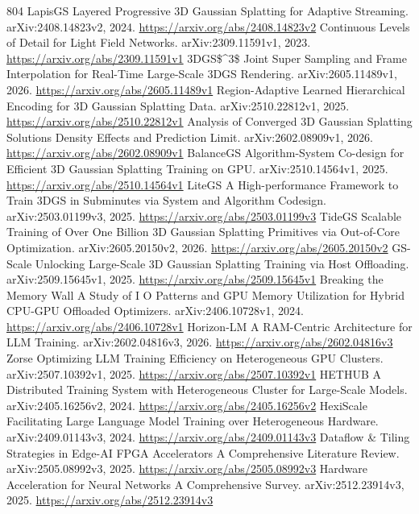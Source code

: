 \documentclass[11pt]{article}
\begin{document}
\begin{thebibliography}{804}
 LapisGS Layered Progressive 3D Gaussian Splatting for Adaptive Streaming. arXiv:2408.14823v2, 2024. \url{https://arxiv.org/abs/2408.14823v2}
 Continuous Levels of Detail for Light Field Networks. arXiv:2309.11591v1, 2023. \url{https://arxiv.org/abs/2309.11591v1}
 3DGS\$\textasciicircum{}3\$ Joint Super Sampling and Frame Interpolation for Real-Time Large-Scale 3DGS Rendering. arXiv:2605.11489v1, 2026. \url{https://arxiv.org/abs/2605.11489v1}
 Region-Adaptive Learned Hierarchical Encoding for 3D Gaussian Splatting Data. arXiv:2510.22812v1, 2025. \url{https://arxiv.org/abs/2510.22812v1}
 Analysis of Converged 3D Gaussian Splatting Solutions Density Effects and Prediction Limit. arXiv:2602.08909v1, 2026. \url{https://arxiv.org/abs/2602.08909v1}
 BalanceGS Algorithm-System Co-design for Efficient 3D Gaussian Splatting Training on GPU. arXiv:2510.14564v1, 2025. \url{https://arxiv.org/abs/2510.14564v1}
 LiteGS A High-performance Framework to Train 3DGS in Subminutes via System and Algorithm Codesign. arXiv:2503.01199v3, 2025. \url{https://arxiv.org/abs/2503.01199v3}
 TideGS Scalable Training of Over One Billion 3D Gaussian Splatting Primitives via Out-of-Core Optimization. arXiv:2605.20150v2, 2026. \url{https://arxiv.org/abs/2605.20150v2}
 GS-Scale Unlocking Large-Scale 3D Gaussian Splatting Training via Host Offloading. arXiv:2509.15645v1, 2025. \url{https://arxiv.org/abs/2509.15645v1}
 Breaking the Memory Wall A Study of I O Patterns and GPU Memory Utilization for Hybrid CPU-GPU Offloaded Optimizers. arXiv:2406.10728v1, 2024. \url{https://arxiv.org/abs/2406.10728v1}
 Horizon-LM A RAM-Centric Architecture for LLM Training. arXiv:2602.04816v3, 2026. \url{https://arxiv.org/abs/2602.04816v3}
 Zorse Optimizing LLM Training Efficiency on Heterogeneous GPU Clusters. arXiv:2507.10392v1, 2025. \url{https://arxiv.org/abs/2507.10392v1}
 HETHUB A Distributed Training System with Heterogeneous Cluster for Large-Scale Models. arXiv:2405.16256v2, 2024. \url{https://arxiv.org/abs/2405.16256v2}
 HexiScale Facilitating Large Language Model Training over Heterogeneous Hardware. arXiv:2409.01143v3, 2024. \url{https://arxiv.org/abs/2409.01143v3}
 Dataflow \& Tiling Strategies in Edge-AI FPGA Accelerators A Comprehensive Literature Review. arXiv:2505.08992v3, 2025. \url{https://arxiv.org/abs/2505.08992v3}
 Hardware Acceleration for Neural Networks A Comprehensive Survey. arXiv:2512.23914v3, 2025. \url{https://arxiv.org/abs/2512.23914v3}

\end{thebibliography}
\end{document}
